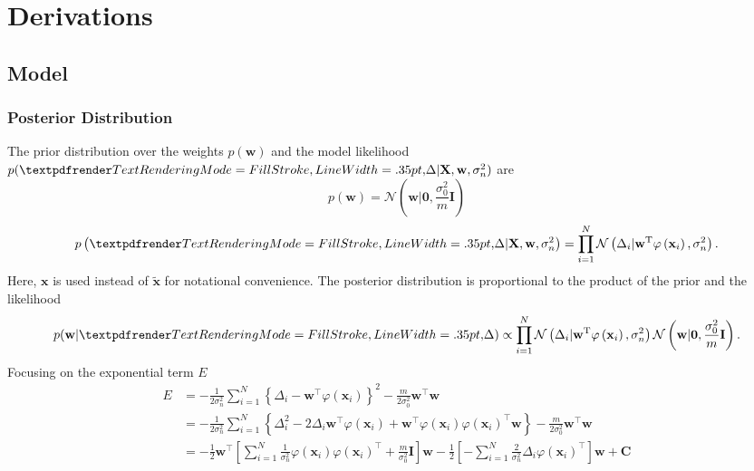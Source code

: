 \chapter{Derivations} 

\section{Model}
\subsection{Posterior Distribution}
\label{A:derivation-posterior-over-weights}
The prior distribution over the weights $p(\mathbf{w})$ and the model likelihood $p(\boldgreek{\Delta} | \mathbf{X}, \mathbf{w}, \sigma_{n}^{2})$ are 
\begin{equation}
    p\left(\mathbf{w}\right)= \mathcal{N}\left(\mathbf{w} | \mathbf{0}, \frac{\sigma_{0}^{2}}{m}\mathbf{I}\right)
\end{equation}
\begin{equation}
    p\left(\boldgreek{\Delta} | \mathbf{X}, \mathbf{w}, \sigma_{n}^{2}\right)=\prod_{i=1}^{N} \mathcal{N}\left(\Delta_{i} | \mathbf{w}^{\mathrm{T}} \varphi\left(\mathbf{x}_{i}\right), \sigma_{n}^{2}\right).
\end{equation}
Here, $\mathbf{x}$ is used instead of $\mathbf{\tilde{x}}$ for notational convenience. The posterior distribution is proportional to the product of the prior and the likelihood
\begin{equation}
    p(\mathbf{w} | \boldgreek{\Delta}) \propto \prod_{i=1}^{N} \mathcal{N}\left(\Delta_{i} | \mathbf{w}^{\mathrm{T}} \varphi\left(\mathbf{x}_{i}\right), \sigma_{n}^{2}\right) \mathcal{N}\left(\mathbf{w} | \mathbf{0}, \frac{\sigma_{0}^{2}}{m}\mathbf{I}\right).
\end{equation}
Focusing on the exponential term $E$
\begin{equation}
    \begin{aligned}  E 
    &=-\frac{1}{2\sigma_{n}^{2}} \sum_{i=1}^{N}\left\{\Delta_{i}-\mathbf{w}^{\top} \varphi\left(\mathbf{x}_{i}\right)\right\}^{2}-\frac{m}{2\sigma_{0}^2}\mathbf{w}^{\top} \mathbf{w} \\ 
    &=-\frac{1}{2\sigma_{n}^{2}} \sum_{i=1}^{N}\left\{\Delta_{i}^{2}-2 \Delta_{i} \mathbf{w}^{\top} \varphi\left(\mathbf{x}_{i}\right)+\mathbf{w}^{\top} \varphi\left(\mathbf{x}_{i}\right) \varphi\left(\mathbf{x}_{i}\right)^{\top} \mathbf{w}\right\}-\frac{m}{2\sigma_{0}^2}\mathbf{w}^{\top} \mathbf{w} \\ 
    &= -\frac{1}{2} \mathbf{w}^{\top}\left[\sum_{i=1}^{N} \frac{1}{\sigma_{n}^{2}} \varphi\left(\mathbf{x}_{i}\right) \varphi\left(\mathbf{x}_{i}\right)^{\top} + \frac{m}{\sigma_{0}^2}\mathbf{I}\right] \mathbf{w} -\frac{1}{2}\left[-\sum_{i=1}^{N}  \frac{2}{\sigma_{n}^{2}} \Delta_{i} \varphi\left(\mathbf{x}_{i}\right)^{\top}\right] \mathbf{w} + \mathbf{C}
    \end{aligned}
    \label{A-posterior-complete-square}
\end{equation}
